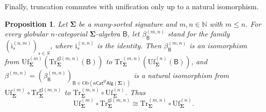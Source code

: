 \documentclass[a4paper, reqno
]{amsart}
\newcommand{\sig}[1]{\mathbf{#1}}             %
\newcommand{\calg}[1]{\boldsymbol{\mathsf{#1}}} %
\newcommand{\gl}{\mathrm{gl}}                %
\newcommand{\Uf}{\mathrm{Uf}}
\newcommand{\Tr}{\mathrm{Tr}}
\theoremstyle{plain}
\newtheorem{proposition}[theorem]{Proposition}
\theoremstyle{definition}
\begin{document}
Finally, truncation commutes with unification only up to a natural isomorphism.

\begin{proposition}\label{PCompatUfTr}
Let $\sig{\Sigma}$ be a many-sorted signature and $m,n\in\mathbb{N}$ with $m\leq n$.
For every globular $n$-categorial $\sig{\Sigma}$-algebra $\calg{B}$, let $\beta^{(m,n)}_{\calg{B}}$ stand for the family $(\mathrm{i}^{(n,m)}_{s})_{s\in S}$, where $\mathrm{i}^{(n,n)}_{s}$ is the identity.
Then $\beta^{(m,n)}_{\calg{B}}$ is an isomorphism from $\Uf^{(m)}_{\sig{\Sigma}}(\Tr^{\gl(m,n)}_{\sig{\Sigma}}(\calg{B}))$ to $\Tr^{(m,n)}_{\sig{\Sigma}}(\Uf^{(n)}_{\sig{\Sigma}}(\calg{B}))$, and $\beta^{(m,n)}=(\beta^{(m,n)}_{\calg{B}})_{\calg{B}\in\mathrm{Ob}(\mathsf{nCat}^{\gl}\mathsf{Alg}(\sig{\Sigma}))}$ is a natural isomorphism from $\Uf^{(m)}_{\sig{\Sigma}}\circ \Tr^{\gl(m,n)}_{\sig{\Sigma}}$ to $\Tr^{(m,n)}_{\sig{\Sigma}}\circ\Uf^{(n)}_{\sig{\Sigma}}$.
Thus
$$
\Uf^{(m)}_{\sig{\Sigma}}\circ \Tr^{\gl(m,n)}_{\sig{\Sigma}}\cong \Tr^{(m,n)}_{\sig{\Sigma}}\circ\Uf^{(n)}_{\sig{\Sigma}}.
$$
\end{proposition}
\end{document}
